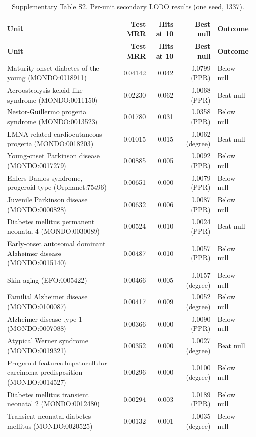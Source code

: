 \documentclass[11pt]{article}
\begin{document}
\begin{longtable}{@{}p{5.2cm} r r r p{2.2cm}@{}}
\caption{Supplementary Table S2. Per-unit secondary LODO results (one seed, 1337).}\\
\toprule
\textbf{Unit} & \textbf{Test MRR} & \textbf{Hits at 10} & \textbf{Best null} & \textbf{Outcome} \\
\midrule
\endfirsthead
\toprule
\textbf{Unit} & \textbf{Test MRR} & \textbf{Hits at 10} & \textbf{Best null} & \textbf{Outcome} \\
\midrule
\endhead
Maturity-onset diabetes of the young (MONDO:0018911) & 0.04142 & 0.042 & 0.0799 (PPR) & Below null \\
Acroosteolysis keloid-like syndrome (MONDO:0011150) & 0.02230 & 0.062 & 0.0068 (PPR) & Beat null \\
Nestor-Guillermo progeria syndrome (MONDO:0013523) & 0.01780 & 0.031 & 0.0358 (PPR) & Below null \\
LMNA-related cardiocutaneous progeria (MONDO:0018203) & 0.01015 & 0.015 & 0.0062 (degree) & Beat null \\
Young-onset Parkinson disease (MONDO:0017279) & 0.00885 & 0.005 & 0.0092 (PPR) & Below null \\
Ehlers-Danlos syndrome, progeroid type (Orphanet:75496) & 0.00651 & 0.000 & 0.0079 (PPR) & Below null \\
Juvenile Parkinson disease (MONDO:0000828) & 0.00632 & 0.006 & 0.0087 (PPR) & Below null \\
Diabetes mellitus permanent neonatal 4 (MONDO:0030089) & 0.00524 & 0.010 & 0.0024 (PPR) & Beat null \\
Early-onset autosomal dominant Alzheimer disease (MONDO:0015140) & 0.00487 & 0.010 & 0.0057 (PPR) & Below null \\
Skin aging (EFO:0005422) & 0.00466 & 0.005 & 0.0157 (degree) & Below null \\
Familial Alzheimer disease (MONDO:0100087) & 0.00417 & 0.009 & 0.0052 (degree) & Below null \\
Alzheimer disease type 1 (MONDO:0007088) & 0.00366 & 0.000 & 0.0090 (PPR) & Below null \\
Atypical Werner syndrome (MONDO:0019321) & 0.00352 & 0.000 & 0.0027 (degree) & Beat null \\
Progeroid features-hepatocellular carcinoma predisposition (MONDO:0014527) & 0.00296 & 0.000 & 0.0100 (degree) & Below null \\
Diabetes mellitus transient neonatal 2 (MONDO:0012480) & 0.00294 & 0.003 & 0.0189 (PPR) & Below null \\
Transient neonatal diabetes mellitus (MONDO:0020525) & 0.00132 & 0.001 & 0.0035 (degree) & Below null \\
\bottomrule
\end{longtable}
\end{document}
